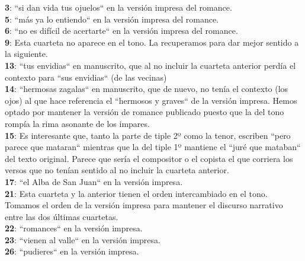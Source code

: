 \noindent \textbf{3}: ``si dan vida tus ojuelos`` en la versión impresa del romance.\\
\textbf{5}: ``más ya lo entiendo`` en la versión impresa del romance.\\ 
\textbf{6}: ``no es difícil de acertarte`` en la versión impresa del romance.\\ 
\textbf{9}: Esta cuarteta no aparece en el tono. La recuperamos para dar mejor sentido a la siguiente.\\
\textbf{13}: ``tus envidias`` en manuscrito, que al no incluir la cuarteta anterior perdía el contexto para ``sus envidias`` (de las vecinas)\\
\textbf{14}: ``hermosas zagalas`` en manuscrito, que de nuevo, no tenía el contexto (los ojos) al que hace referencia el ``hermosos y graves`` de la versión impresa. Hemos optado por mantener la versión de romance publicado puesto que la del tono rompía la rima asonante de los impares.\\
\textbf{15}: Es interesante que, tanto la parte de tiple 2º como la tenor, escriben ``pero parece que mataran`` mientras que la del tiple 1º mantiene el ``juré que mataban`` del texto original. Parece que sería el compositor o el copista el que corriera los versos que no tenían sentido al no incluir la cuarteta anterior.\\
\textbf{17}: ``el Alba de San Juan`` en la versión impresa.\\
\textbf{21}: Esta cuarteta y la anterior tienen el orden intercambiado en el tono. Tomamos el orden de la versión impresa para mantener el discurso narrativo entre las dos últimas cuartetas. \\
\textbf{22}: ``romances`` en la versión impresa.\\
\textbf{23}: ``vienen al valle`` en la versión impresa.\\
\textbf{26}: ``pudieres`` en la versión impresa.
